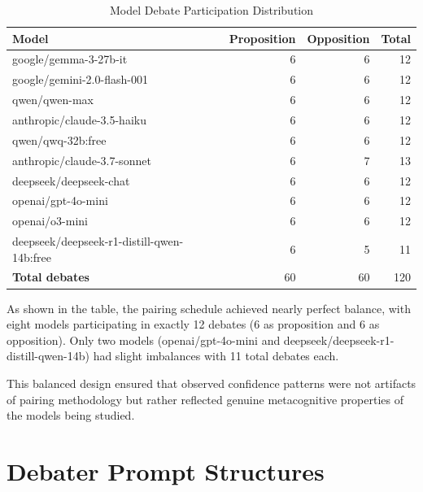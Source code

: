\documentclass{article}
\begin{document}
\begin{table}[h]
  \caption{Model Debate Participation Distribution}
  \label{tab}
  \centering
  \begin{tabular}{lrrr}
  \toprule
  \textbf{Model} & \textbf{Proposition} & \textbf{Opposition} & \textbf{Total} \\
  \midrule
  google/gemma-3-27b-it & 6 & 6 & 12 \\
  google/gemini-2.0-flash-001 & 6 & 6 & 12 \\
  qwen/qwen-max & 6 & 6 & 12 \\
  anthropic/claude-3.5-haiku & 6 & 6 & 12 \\
  qwen/qwq-32b:free & 6 & 6 & 12 \\
  anthropic/claude-3.7-sonnet & 6 & 7 & 13 \\
  deepseek/deepseek-chat & 6 & 6 & 12 \\
  openai/gpt-4o-mini & 6 & 6 & 12 \\
  openai/o3-mini & 6 & 6 & 12 \\
  deepseek/deepseek-r1-distill-qwen-14b:free & 6 & 5 & 11 \\
  \midrule
  \textbf{Total debates} & 60 & 60 & 120 \\
  \bottomrule
  \end{tabular}
\end{table}

As shown in the table, the pairing schedule achieved nearly perfect balance, with eight models participating in exactly 12 debates (6 as proposition and 6 as opposition). Only two models (openai/gpt-4o-mini and deepseek/deepseek-r1-distill-qwen-14b) had slight imbalances with 11 total debates each.

This balanced design ensured that observed confidence patterns were not artifacts of pairing methodology but rather reflected genuine metacognitive properties of the models being studied.






\section{Debater Prompt Structures}
\label{appendix:debater_prompts}
\end{document}
